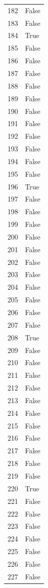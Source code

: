 \documentclass[
  letterpaper,
  DIV=11,
  numbers=noendperiod]{scrreprt}
\begin{document}
\begin{tabular}{ll}
182  &  False \\
183  &  False \\
184  &   True \\
185  &  False \\
186  &  False \\
187  &  False \\
188  &  False \\
189  &  False \\
190  &  False \\
191  &  False \\
192  &  False \\
193  &  False \\
194  &  False \\
195  &  False \\
196  &   True \\
197  &  False \\
198  &  False \\
199  &  False \\
200  &  False \\
201  &  False \\
202  &  False \\
203  &  False \\
204  &  False \\
205  &  False \\
206  &  False \\
207  &  False \\
208  &   True \\
209  &  False \\
210  &  False \\
211  &  False \\
212  &  False \\
213  &  False \\
214  &  False \\
215  &  False \\
216  &  False \\
217  &  False \\
218  &  False \\
219  &  False \\
220  &   True \\
221  &  False \\
222  &  False \\
223  &  False \\
224  &  False \\
225  &  False \\
226  &  False \\
227  &  False \\

\end{tabular}
\end{document}
